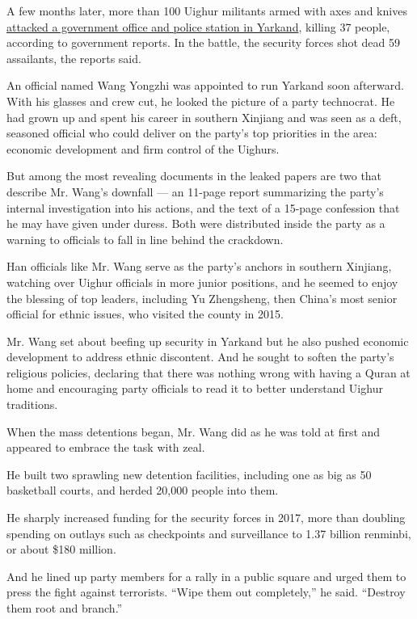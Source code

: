 A few months later, more than 100 Uighur militants armed with axes and
knives
\href{https://www.nytimes.com/2014/08/04/world/asia/china-says-nearly-100-are-killed-in-week-of-unrest-in-xinjiang.html}{attacked
a government office and police station in Yarkand}, killing 37 people,
according to government reports. In the battle, the security forces shot
dead 59 assailants, the reports said.

An official named Wang Yongzhi was appointed to run Yarkand soon
afterward. With his glasses and crew cut, he looked the picture of a
party technocrat. He had grown up and spent his career in southern
Xinjiang and was seen as a deft, seasoned official who could deliver on
the party's top priorities in the area: economic development and firm
control of the Uighurs.

But among the most revealing documents in the leaked papers are two that
describe Mr. Wang's downfall --- an 11-page report summarizing the
party's internal investigation into his actions, and the text of a
15-page confession that he may have given under duress. Both were
distributed inside the party as a warning to officials to fall in line
behind the crackdown.

Han officials like Mr. Wang serve as the party's anchors in southern
Xinjiang, watching over Uighur officials in more junior positions, and
he seemed to enjoy the blessing of top leaders, including Yu Zhengsheng,
then China's most senior official for ethnic issues, who visited the
county in 2015.

Mr. Wang set about beefing up security in Yarkand but he also pushed
economic development to address ethnic discontent. And he sought to
soften the party's religious policies, declaring that there was nothing
wrong with having a Quran at home and encouraging party officials to
read it to better understand Uighur traditions.

When the mass detentions began, Mr. Wang did as he was told at first and
appeared to embrace the task with zeal.

He built two sprawling new detention facilities, including one as big as
50 basketball courts, and herded 20,000 people into them.

He sharply increased funding for the security forces in 2017, more than
doubling spending on outlays such as checkpoints and surveillance to
1.37 billion renminbi, or about \$180 million.

And he lined up party members for a rally in a public square and urged
them to press the fight against terrorists. ``Wipe them out
completely,'' he said. ``Destroy them root and branch.''

